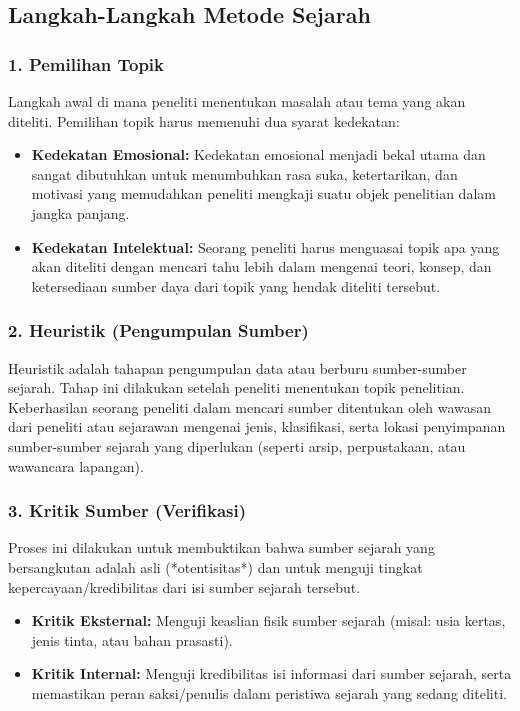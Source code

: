 \documentclass[12pt, a4paper]{article}
\begin{document}
\subsection{Langkah-Langkah Metode Sejarah}
\subsubsection{1. Pemilihan Topik}
Langkah awal di mana peneliti menentukan masalah atau tema yang akan diteliti. Pemilihan topik harus memenuhi dua syarat kedekatan:
\begin{itemize}
	\item \textbf{Kedekatan Emosional:} Kedekatan emosional menjadi bekal utama dan sangat dibutuhkan untuk menumbuhkan rasa suka, ketertarikan, dan motivasi yang memudahkan peneliti mengkaji suatu objek penelitian dalam jangka panjang.
	\item \textbf{Kedekatan Intelektual:} Seorang peneliti harus menguasai topik apa yang akan diteliti dengan mencari tahu lebih dalam mengenai teori, konsep, dan ketersediaan sumber daya dari topik yang hendak diteliti tersebut.
\end{itemize}

\subsubsection{2. Heuristik (Pengumpulan Sumber)}
Heuristik adalah tahapan pengumpulan data atau berburu sumber-sumber sejarah. Tahap ini dilakukan setelah peneliti menentukan topik penelitian. Keberhasilan seorang peneliti dalam mencari sumber ditentukan oleh wawasan dari peneliti atau sejarawan mengenai jenis, klasifikasi, serta lokasi penyimpanan sumber-sumber sejarah yang diperlukan (seperti arsip, perpustakaan, atau wawancara lapangan).

\subsubsection{3. Kritik Sumber (Verifikasi)}
Proses ini dilakukan untuk membuktikan bahwa sumber sejarah yang bersangkutan adalah asli (*otentisitas*) dan untuk menguji tingkat kepercayaan/kredibilitas dari isi sumber sejarah tersebut.
\begin{itemize}
	\item \textbf{Kritik Eksternal:} Menguji keaslian fisik sumber sejarah (misal: usia kertas, jenis tinta, atau bahan prasasti).
	\item \textbf{Kritik Internal:} Menguji kredibilitas isi informasi dari sumber sejarah, serta memastikan peran saksi/penulis dalam peristiwa sejarah yang sedang diteliti.
\end{itemize}
\end{document}
